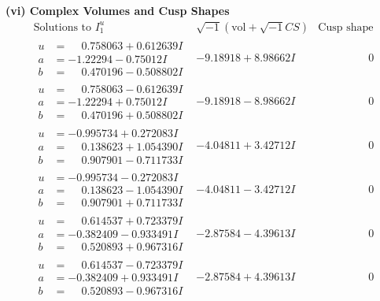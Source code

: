 \documentclass[1p]{elsarticle_modified}
\theoremstyle{definition}
\newcommand{\I}{\sqrt{-1}}
\begin{document}
\newpage\flushleft \textbf{(vi) Complex Volumes and Cusp Shapes}
$$\begin{array}{c|c|c}  
\text{Solutions to }I^u_{1}& \I (\text{vol} + \sqrt{-1}CS) & \text{Cusp shape}\\
 \hline 
\begin{aligned}
u &= \phantom{-}0.758063 + 0.612639 I \\
a &= -1.22294 - 0.75012 I \\
b &= \phantom{-}0.470196 - 0.508802 I\end{aligned}
 & -9.18918 + 8.98662 I & \phantom{-0.000000 } 0 \\ \hline\begin{aligned}
u &= \phantom{-}0.758063 - 0.612639 I \\
a &= -1.22294 + 0.75012 I \\
b &= \phantom{-}0.470196 + 0.508802 I\end{aligned}
 & -9.18918 - 8.98662 I & \phantom{-0.000000 } 0 \\ \hline\begin{aligned}
u &= -0.995734 + 0.272083 I \\
a &= \phantom{-}0.138623 + 1.054390 I \\
b &= \phantom{-}0.907901 - 0.711733 I\end{aligned}
 & -4.04811 + 3.42712 I & \phantom{-0.000000 } 0 \\ \hline\begin{aligned}
u &= -0.995734 - 0.272083 I \\
a &= \phantom{-}0.138623 - 1.054390 I \\
b &= \phantom{-}0.907901 + 0.711733 I\end{aligned}
 & -4.04811 - 3.42712 I & \phantom{-0.000000 } 0 \\ \hline\begin{aligned}
u &= \phantom{-}0.614537 + 0.723379 I \\
a &= -0.382409 - 0.933491 I \\
b &= \phantom{-}0.520893 + 0.967316 I\end{aligned}
 & -2.87584 - 4.39613 I & \phantom{-0.000000 } 0 \\ \hline\begin{aligned}
u &= \phantom{-}0.614537 - 0.723379 I \\
a &= -0.382409 + 0.933491 I \\
b &= \phantom{-}0.520893 - 0.967316 I\end{aligned}
 & -2.87584 + 4.39613 I & \phantom{-0.000000 } 0 \\ \hline\begin{aligned}

\end{aligned}
\end{array}$$
\end{document}
